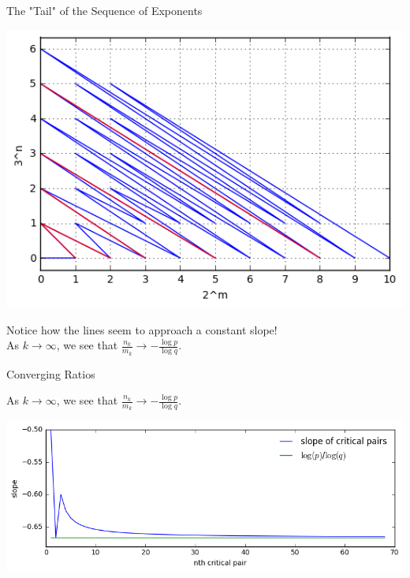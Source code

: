 \documentclass{beamer}
\begin{document}
\begin{frame}{The "Tail" of the Sequence of Exponents}%
\begin{center}

\includegraphics[scale=.48]{slope_plot4.png} 

Notice how the lines seem to approach a constant slope! \\As $k \to \infty$, we see that $\frac{n_k}{m_k} \to -\frac{\log p}{\log q}$. 
\end{center}

\end{frame}
\begin{frame}{Converging Ratios}%

As $k \to \infty$, we see that $\frac{n_k}{m_k} \to -\frac{\log p}{\log q}$. 

\begin{center}
\includegraphics[scale=.75]{critical_slopes3.png}
\end{center}
\end{frame}
\end{document}
